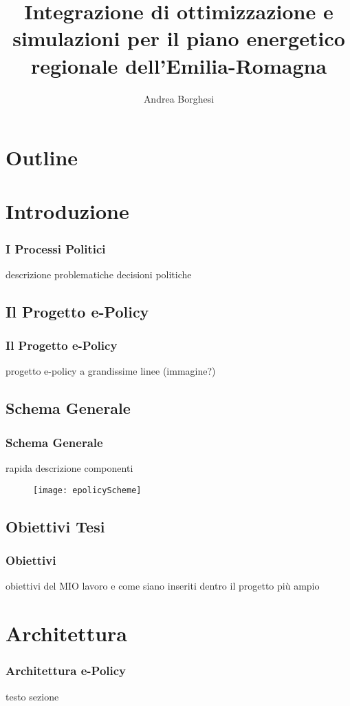 \documentclass{beamer}
\title[titolo breve]{Integrazione di ottimizzazione e simulazioni per il piano energetico regionale dell'Emilia-Romagna}
\author{Andrea Borghesi}
\begin{document}
	\begin{frame}
		\titlepage
	\end{frame}

\section*{Outline}
\begin{frame}
	\tableofcontents
\end{frame}

\section{Introduzione}
	\begin{frame}
		\frametitle{I Processi Politici}
		descrizione problematiche decisioni politiche
 	\end{frame}
\subsection{Il Progetto e-Policy}
	\begin{frame}
		\frametitle{Il Progetto e-Policy}
		progetto e-policy a grandissime linee (immagine?)
 	\end{frame}
\subsection{Schema Generale}
	\begin{frame}
		\frametitle{Schema Generale}
		rapida descrizione componenti
		\begin{figure}[hbt]
			\centering
			\texttt{[image: epolicyScheme]}
			\label{epolicyScheme}
		\end{figure}
	\end{frame}
\subsection{Obiettivi Tesi}
	\begin{frame}
		\frametitle{Obiettivi}
		obiettivi del MIO lavoro e come siano inseriti dentro il progetto più ampio	
	\end{frame}
  
\section{Architettura}
	\begin{frame}
		\frametitle{Architettura e-Policy}
		testo sezione
  	\end{frame}
\end{document}
